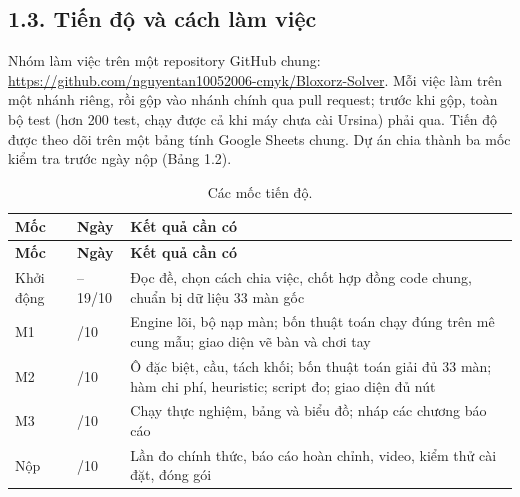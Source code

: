 \subsection{1.3. Tiến độ và cách làm việc}

Nhóm làm việc trên một repository GitHub chung: \href{https://github.com/nguyentan10052006-cmyk/Bloxorz-Solver}{\url{https://github.com/nguyentan10052006-cmyk/Bloxorz-Solver}}. Mỗi việc làm trên một nhánh riêng, rồi gộp vào nhánh chính qua pull request; trước khi gộp, toàn bộ test (hơn 200 test, chạy được cả khi máy chưa cài Ursina) phải qua. Tiến độ được theo dõi trên một bảng tính Google Sheets chung. Dự án chia thành ba mốc kiểm tra trước ngày nộp (Bảng 1.2).


\begin{longtable}[]{@{}
  >{\raggedright\arraybackslash}p{}
  >{\raggedright\arraybackslash}p{}
  >{\raggedright\arraybackslash}p{}@{}}
\caption{ Các mốc tiến độ.}\tabularnewline
\toprule\noalign{}
\rowcolor{tablehead}\begin{minipage}[b]{\linewidth}\raggedright
\textbf{Mốc}
\end{minipage} & \begin{minipage}[b]{\linewidth}\raggedright
\textbf{Ngày}
\end{minipage} & \begin{minipage}[b]{\linewidth}\raggedright
\textbf{Kết quả cần có}
\end{minipage} \\
\midrule\noalign{}
\endfirsthead
\toprule\noalign{}
\rowcolor{tablehead}\begin{minipage}[b]{\linewidth}\raggedright
\textbf{Mốc}
\end{minipage} & \begin{minipage}[b]{\linewidth}\raggedright
\textbf{Ngày}
\end{minipage} & \begin{minipage}[b]{\linewidth}\raggedright
\textbf{Kết quả cần có}
\end{minipage} \\
\midrule\noalign{}
\endhead
\bottomrule\noalign{}
\endlastfoot
Khởi động & 15--19/10 & Đọc đề, chọn cách chia việc, chốt hợp đồng code chung, chuẩn bị dữ liệu 33 màn gốc \\
\rowrule
M1 & 21/10 & Engine lõi, bộ nạp màn; bốn thuật toán chạy đúng trên mê cung mẫu; giao diện vẽ bàn và chơi tay \\
\rowrule
M2 & 25/10 & Ô đặc biệt, cầu, tách khối; bốn thuật toán giải đủ 33 màn; hàm chi phí, heuristic; script đo; giao diện đủ nút \\
\rowrule
M3 & 28/10 & Chạy thực nghiệm, bảng và biểu đồ; nháp các chương báo cáo \\
\rowrule
Nộp & 31/10 & Lần đo chính thức, báo cáo hoàn chỉnh, video, kiểm thử cài đặt, đóng gói \\
\end{longtable}

